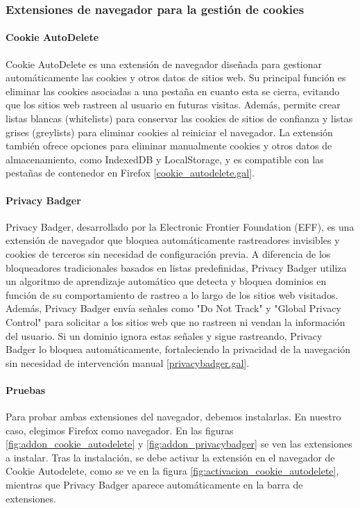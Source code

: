 \subsubsection{Extensiones de navegador para la gestión de cookies}

\paragraph{Cookie AutoDelete}

Cookie AutoDelete es una extensión de navegador diseñada para gestionar automáticamente las cookies y otros datos de sitios web. Su principal función es eliminar las cookies asociadas a una pestaña en cuanto esta se cierra, evitando que los sitios web rastreen al usuario en futuras visitas. Además, permite crear listas blancas (whitelists) para conservar las cookies de sitios de confianza y listas grises (greylists) para eliminar cookies al reiniciar el navegador. La extensión también ofrece opciones para eliminar manualmente cookies y otros datos de almacenamiento, como IndexedDB y LocalStorage, y es compatible con las pestañas de contenedor en Firefox [\url{cookie_autodelete.gal}].

\paragraph{Privacy Badger}

Privacy Badger, desarrollado por la Electronic Frontier Foundation (EFF), es una extensión de navegador que bloquea automáticamente rastreadores invisibles y cookies de terceros sin necesidad de configuración previa. A diferencia de los bloqueadores tradicionales basados en listas predefinidas, Privacy Badger utiliza un algoritmo de aprendizaje automático que detecta y bloquea dominios en función de su comportamiento de rastreo a lo largo de los sitios web visitados. Además, Privacy Badger envía señales como "Do Not Track" y "Global Privacy Control" para solicitar a los sitios web que no rastreen ni vendan la información del usuario. Si un dominio ignora estas señales y sigue rastreando, Privacy Badger lo bloquea automáticamente, fortaleciendo la privacidad de la navegación sin necesidad de intervención manual [\url{privacybadger.gal}].

\paragraph{Pruebas}

Para probar ambas extensiones del navegador, debemos instalarlas. En nuestro caso, elegimos Firefox como navegador. En las figuras \ref{fig:addon_cookie_autodelete} y \ref{fig:addon_privacybadger} se ven las extensiones a instalar. Tras la instalación, se debe activar la extensión en el navegador de Cookie Autodelete, como se ve en la figura \ref{fig:activacion_cookie_autodelete}, mientras que Privacy Badger aparece automáticamente en la barra de extensiones.

